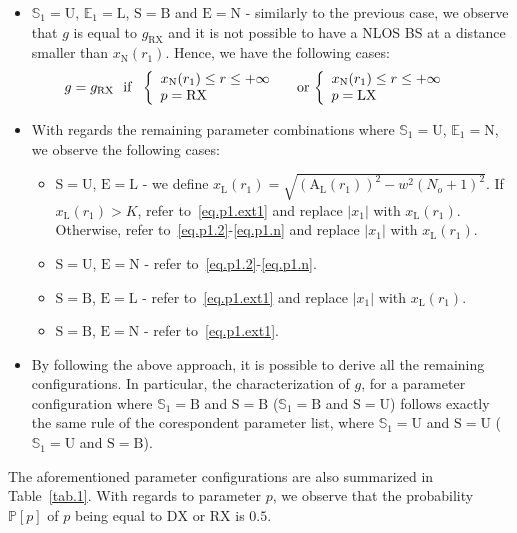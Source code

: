 \documentclass[10pt,journal,a4paper]{IEEEtran}
\begin{document}
\begin{itemize}
\item $\mathbb{S}_1 = \mathrm{U}$, $\mathbb{E}_1 = \mathrm{L}$, $\mathrm{S} = \mathrm{B}$ and $\mathrm{E} = \mathrm{N}$ - similarly to the previous case, we observe that $g$ is equal to $g_\mathrm{RX}$ and it is not possible to have a NLOS BS at a distance smaller than $x_\mathrm{N}(r_1)$. Hence, we have the following cases:
\begin{equation}\label{eq.p1.ext3}
		\hspace{-5mm}g = g_\mathrm{RX} \,\,\,\, \text{if} \,\,\,\, \left\{ 
			\begin{array}{l l}
				x_\mathrm{N}(r_1) \leq r \leq +\infty & \\
				p = \mathrm{RX} & 
				\end{array} \right. \,\text{or}\, \left\{ 
			\begin{array}{l l}
				x_\mathrm{N}(r_1) \leq r \leq +\infty & \\
				p = \mathrm{LX} & 
				\end{array} \right.\hspace{-1mm}
\end{equation}
\item With regards the remaining parameter combinations where $\mathbb{S}_1 = \mathrm{U}$, $\mathbb{E}_1 = \mathrm{N}$, we observe the following cases:
\begin{itemize}
\item $\mathrm{S} = \mathrm{U}$, $\mathrm{E} = \mathrm{L}$ - we define $x_\mathrm{L}(r_1) = \sqrt{(\mathrm{A}_\mathrm{L}(r_1))^2 - w^2(N_o+1)^2}$. If $x_\mathrm{L}(r_1) > K$, refer to~\eqref{eq.p1.ext1} and replace $|x_1|$ with $x_\mathrm{L}(r_1)$. Otherwise, refer to~\eqref{eq.p1.2}-\eqref{eq.p1.n} and replace $|x_1|$ with $x_\mathrm{L}(r_1)$.
\item $\mathrm{S} = \mathrm{U}$, $\mathrm{E} = \mathrm{N}$ - refer to~\eqref{eq.p1.2}-\eqref{eq.p1.n}.
\item $\mathrm{S} = \mathrm{B}$, $\mathrm{E} = \mathrm{L}$ - refer to~\eqref{eq.p1.ext1} and replace $|x_1|$ with $x_\mathrm{L}(r_1)$.
\item $\mathrm{S} = \mathrm{B}$, $\mathrm{E} = \mathrm{N}$ - refer to~\eqref{eq.p1.ext1}.
\end{itemize}
\item By following the above approach, it is possible to derive all the remaining configurations. In particular, the characterization of $g$, for a parameter configuration where $\mathbb{S}_1 = \mathrm{B}$ and $\mathrm{S} = \mathrm{B}$ ($\mathbb{S}_1 = \mathrm{B}$ and $\mathrm{S} = \mathrm{U}$) follows exactly the same rule of the corespondent parameter list, where $\mathbb{S}_1 = \mathrm{U}$ and $\mathrm{S} = \mathrm{U}$ ($\mathbb{S}_1 = \mathrm{U}$ and $\mathrm{S} = \mathrm{B}$).
\end{itemize}
The aforementioned parameter configurations are also summarized in Table~\ref{tab.1}. With regards to parameter $p$, we observe that the probability $\mathbb{P}[p]$ of $p$ being equal to $\mathrm{DX}$ or $\mathrm{RX}$ is $0.5$. 
\end{document}
